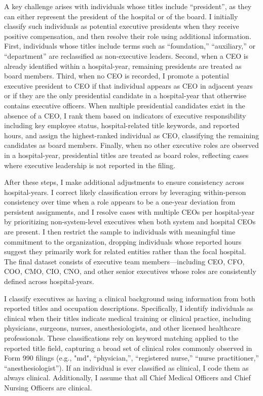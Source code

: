 \documentclass[12pt]{article}
\begin{document}
    A key challenge arises with individuals whose titles include “president”, as they can either represent the president of the hospital or of the board. I initially classify such individuals as potential executive presidents when they receive positive compensation, and then resolve their role using additional information. First, individuals whose titles include terms such as “foundation,” “auxiliary,” or “department” are reclassified as non-executive leaders. Second, when a CEO is already identified within a hospital-year, remaining presidents are treated as board members. Third, when no CEO is recorded, I promote a potential executive president to CEO if that individual appears as CEO in adjacent years or if they are the only presidential candidate in a hospital-year that otherwise contains executive officers. When multiple presidential candidates exist in the absence of a CEO, I rank them based on indicators of executive responsibility including key employee status, hospital-related title keywords, and reported hours, and assign the highest-ranked individual as CEO, classifying the remaining candidates as board members. Finally, when no other executive roles are observed in a hospital-year, presidential titles are treated as board roles, reflecting cases where executive leadership is not reported in the filing.
        
    After these steps, I make additional adjustments to ensure consistency across hospital-years. I correct likely classification errors by leveraging within-person consistency over time when a role appears to be a one-year deviation from persistent assignments, and I resolve cases with multiple CEOs per hospital-year by prioritizing non-system-level executives when both system and hospital CEOs are present. I then restrict the sample to individuals with meaningful time commitment to the organization, dropping individuals whose reported hours suggest they primarily work for related entities rather than the focal hospital. The final dataset consists of executive team members—including CEO, CFO, COO, CMO, CIO, CNO, and other senior executives whose roles are consistently defined across hospital-years.

    I classify executives as having a clinical background using information from both reported titles and occupation descriptions. Specifically, I identify individuals as clinical when their titles indicate medical training or clinical practice, including physicians, surgeons, nurses, anesthesiologists, and other licensed healthcare professionals. These classifications rely on keyword matching applied to the reported title field, capturing a broad set of clinical roles commonly observed in Form 990 filings (e.g., "md", “physician,”, “registered nurse,” “nurse practitioner,” “anesthesiologist”). If an individual is ever classified as clinical, I code them as always clinical. Additionally, I assume that all Chief Medical Officers and Chief Nursing Officers are clinical. 
\end{document}
